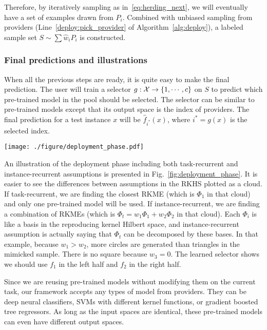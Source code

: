 \documentclass[paper=letter, fontsize=20pt]{article}
\begin{document}
Therefore, by iteratively sampling as in~\eqref{eq:herding_next}, we will eventually have a set of examples drawn from $P_i$. Combined with unbiased sampling from providers (Line~\ref{deploy:pick_provider} of Algorithm~\ref{alg:deploy}), a labeled sample set $S\sim \sum \widehat{w}_i P_i$ is constructed.
\subsubsection{Final predictions and illustrations}
When all the previous steps are ready, it is quite easy to make the final prediction. The user will train a selector $g:\mathcal{X}\rightarrow \{1,\cdots,c\}$ on $S$ to predict which pre-trained model in the pool should be selected. The selector can be similar to pre-trained models except that its output space is the index of providers. The final prediction for a test instance $x$ will be $\widehat{f}_{i^*}(x)$, where $i^*=g(x)$ is the selected index.
\begin{figure*}[htb]
\centering
\texttt{[image: ./figure/deployment\_phase.pdf]}
\caption{An illustration of the deployment phase.}\label{fig:deployment_phase}
\end{figure*}

An illustration of the deployment phase including both task-recurrent and instance-recurrent assumptions is presented in Fig.~\ref{fig:deployment_phase}. It is easier to see the differences between assumptions in the RKHS plotted as a cloud. If task-recurrent, we are finding the closest RKME (which is $\Phi_1$ in that cloud) and only one pre-trained model will be used. If instance-recurrent, we are finding a combination of RKMEs (which is $\Phi_t=w_1 \Phi_1+w_2 \Phi_2$ in that cloud). Each $\Phi_i$ is like a basis in the reproducing kernel Hilbert space, and instance-recurrent assumption is actually saying that $\Phi_t$ can be decomposed by these bases. In that example, because $w_1>w_2$, more circles are generated than triangles in the mimicked sample. There is no square because $w_3=0$. The learned selector shows we should use $f_1$ in the left half and $f_2$ in the right half.

Since we are reusing pre-trained models without modifying them on the current task, our framework accepts any types of model from providers. They can be deep neural classifiers, SVMs with different kernel functions, or gradient boosted tree regressors. As long as the input spaces are identical, these pre-trained models can even have different output spaces.
\end{document}
